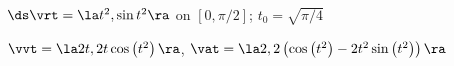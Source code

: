 {$\ds \vrt = \la t^2,\sin t^2 \ra$ on $[0,\pi/2]$; $t_0=\sqrt{\pi/4}$
}
{
$\vvt = \la 2 t,2 t \cos \left(t^2\right)\ra$, $\vat = \la 2,2 \left(\cos \left(t^2\right)-2 t^2 \sin \left(t^2\right)\right)\ra$

}
